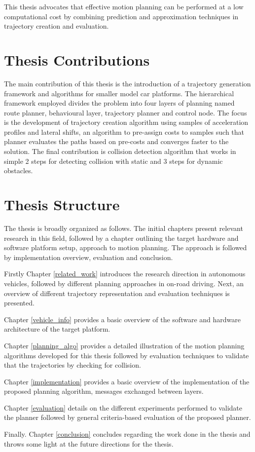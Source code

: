 This thesis advocates that effective motion planning can be performed at a low computational cost by combining prediction and approximation techniques in trajectory creation and evaluation.

\section{Thesis Contributions}

The main contribution of this thesis is the introduction of a trajectory generation framework and algorithms for smaller model car platforms. The hierarchical framework employed divides the problem into four layers of planning named route planner, behavioural layer, trajectory planner and control node. The focus is the development of trajectory creation algorithm using samples of acceleration profiles and lateral shifts, an algorithm to pre-assign costs to samples such that planner evaluates the paths based on pre-costs and converges faster to the solution. The final contribution is collision detection algorithm that works in simple 2 steps for detecting collision with static and 3 steps for dynamic obstacles. 

\section{Thesis Structure}


The thesis is broadly organized as follows. The initial chapters present relevant research in this field, followed by a chapter outlining the target hardware and software platform setup, approach to motion planning. The approach is followed by implementation overview, evaluation and conclusion.

Firstly Chapter \ref{related_work} introduces the research direction in autonomous vehicles, followed by different planning approaches in on-road driving. Next, an overview of different trajectory representation and evaluation techniques is presented.

Chapter \ref{vehicle_info} provides a basic overview of the software and hardware architecture of the target platform.

Chapter \ref{planning_algo} provides a detailed illustration of the motion planning algorithms developed for this thesis followed by evaluation techniques to validate that the trajectories by checking for collision.

Chapter \ref{implementation} provides a basic overview of the implementation of the proposed planning algorithm, messages exchanged between layers.

Chapter \ref{evaluation} details on the different experiments performed to validate the planner followed by general criteria-based evaluation of the proposed planner.

Finally. Chapter \ref{conclusion} concludes regarding the work done in the thesis and throws some light at the future directions for the thesis.
